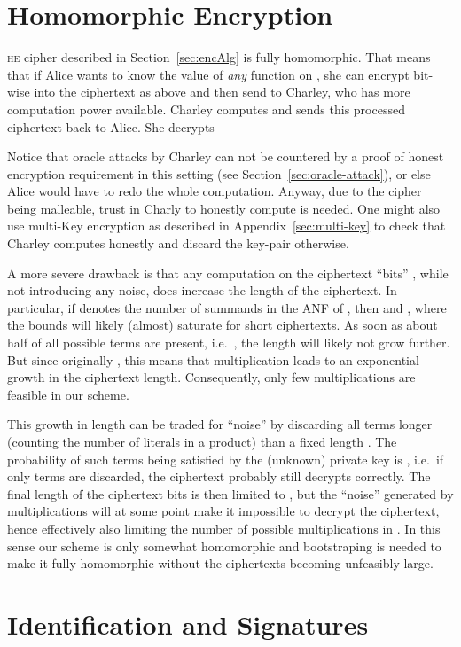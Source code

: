 \documentclass[final,journal,compsoc]{IEEEtran}
\begin{document}
\section{Homomorphic Encryption\label{sec:homom-encrypt}}
 \textsc{he} cipher described in Section~\ref{sec:encAlg} is fully
 homomorphic. That means that if Alice wants to know the value of \emph{any} function  on , she can encrypt  bit-wise into the ciphertext
  as
 above and then send  to Charley, who has more computation power
 available. Charley computes  and sends this processed
 ciphertext back to Alice. She decrypts


Notice that oracle attacks by Charley can not be
countered by a proof of honest encryption requirement in this setting (see
Section~\ref{sec:oracle-attack}), or else Alice would have to redo the whole
computation. Anyway, due to the cipher being malleable,
trust in Charly to honestly compute  is needed. 
One might also use multi-Key encryption
as described in Appendix~\ref{sec:multi-key} to check that Charley computes
honestly and discard the key-pair otherwise.

A more severe drawback is that any computation on the ciphertext ``bits''
, while not introducing any noise, does increase the length of
the ciphertext. In particular, if  denotes the number of summands
in the ANF of , then 
 and ,
where the bounds will likely (almost) saturate for short ciphertexts. As
soon as about half of all possible terms are present, i.e.\ , the length will likely not grow further. But since
originally ,
this means that multiplication leads to an exponential growth in the
ciphertext length. Consequently, only few multiplications are feasible in our scheme.

This growth in length can be traded for ``noise'' by discarding all
terms longer (counting the number of literals in a product) than a
fixed length . The probability of such terms being satisfied by
the (unknown) private key is , i.e.\ if only  terms
are discarded, the ciphertext probably still decrypts correctly. The final length
of the ciphertext bits is then limited to , but the ``noise''
generated by multiplications will at some point make it impossible to
decrypt the ciphertext, hence effectively also limiting the number of
possible multiplications in .
In this sense our scheme is only somewhat homomorphic and bootstraping
is needed to make it fully homomorphic
without the ciphertexts becoming unfeasibly large.



\section{Identification and Signatures\label{sec:ident-sign}}
\end{document}
